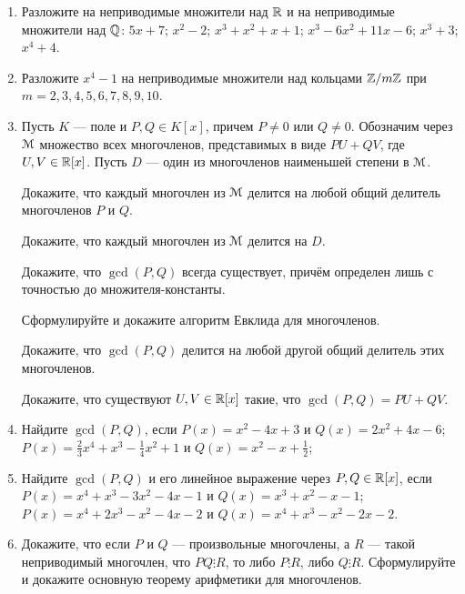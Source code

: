 \begin{enumerate}
\item Разложите на неприводимые множители над $\mathbb R$ и на неприводимые множители над $\mathbb Q$:
\ipunkt $5x + 7$; \ipunkt $x^2 - 2$; \ipunkt $x^3 + x^2 + x + 1$;
\ipunkt $x^3 - 6x^2 + 11x - 6$; \ipunkt $x^3 + 3$; \ipunkt $x^4 + 4$.

\item Разложите $x^4-1$ на неприводимые множители над кольцами $\mathbb Z/m\mathbb Z$ при $m=2,3,4,5,6,7,8,9,10$.

\item Пусть $K$ --- поле и $P, Q \in K[x]$, причем $P\ne 0$ или $Q\ne 0$. Обозначим через $\mathcal M$ множество всех многочленов,
представимых в виде $PU + QV$, где $U, V \in \mathbb R[x]$. Пусть $D$ --- один из многочленов наименьшей степени в $\mathcal M$.

\noindent\ipunkt Докажите, что каждый многочлен из $\mathcal M$ делится на любой общий делитель многочленов $P$ и $Q$.

\noindent\ipunkt Докажите, что каждый многочлен из $\mathcal M$ делится на $D$.

\noindent\ipunkt Докажите, что $\gcd(P, Q)$ всегда существует, причём определен лишь с точностью до множителя-константы.

\noindent\ipunkt Сформулируйте и докажите алгоритм Евклида для многочленов.

\noindent\ipunkt Докажите, что $\gcd(P, Q)$ делится на любой другой общий делитель этих многочленов.

\noindent\ipunkt Докажите, что существуют $U, V \in \mathbb R[x]$ такие, что $\gcd(P, Q) = PU + QV$.

\item Найдите $\gcd(P, Q)$, если
\ipunkt $P(x) = x^2 - 4x + 3$ и $Q(x) = 2x^2 + 4x - 6$;
\ipunkt $P(x) = \frac{2}{3} x^4  + x^3 - \frac 14 x^2 + 1$ и $Q(x) = x^2 - x + \frac 12$;

\item Найдите $\gcd(P, Q)$ и его линейное выражение через $P, Q \in \mathbb R[x]$, если
\ipunkt $P(x) = x^4 + x^3 -3x^2 - 4x - 1$ и $Q(x) = x^3 + x^2 - x - 1$;
\ipunkt $P(x) = x^4 + 2x^3 - x^2 - 4x - 2$ и $Q(x) = x^4 + x^3 - x^2 - 2x - 2$.

\item\ipunkt Докажите, что если $P$ и $Q$ --- произвольные многочлены, а $R$ --- такой неприводимый многочлен,
что $PQ\vdots R$, то либо $P \vdots R$, либо $Q\vdots R$.
\ipunkt Сформулируйте и докажите основную теорему арифметики для многочленов.


\end{enumerate}






